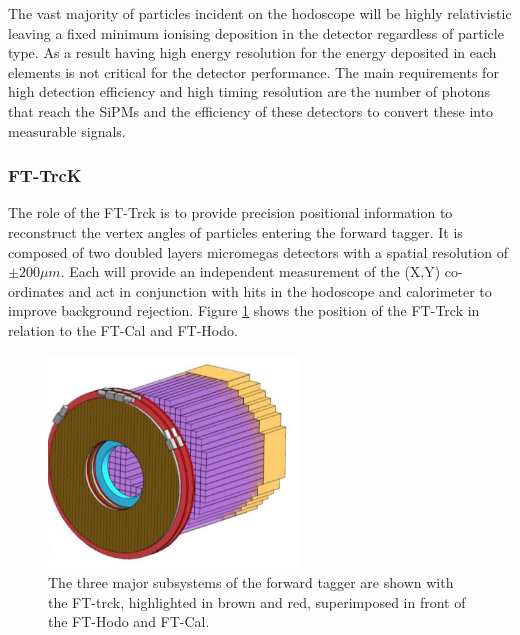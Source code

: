 The vast majority of particles incident on the hodoscope will be highly relativistic leaving a fixed minimum ionising deposition in the detector regardless of particle type. As a result having high energy resolution for the energy deposited in each elements is not critical for the detector performance. The main requirements for high detection efficiency and high timing resolution are the number of photons that reach the SiPMs and the efficiency of these detectors to convert these into measurable signals.

\subsubsection{FT-TrcK}

The role of the FT-Trck is to provide precision positional information to reconstruct the vertex angles of particles entering the forward tagger. It is composed of two doubled layers micromegas detectors with a spatial resolution of $\pm 200\mu{m}$. Each will provide an independent measurement of the (X,Y) co-ordinates and act in conjunction with hits in the hodoscope and calorimeter to improve background rejection. Figure \ref{fttrck} shows the position of the FT-Trck in relation to the FT-Cal and FT-Hodo.

\begin{figure}
	\centering
	\includegraphics[width=0.6\textwidth]{ImgChap1/fttrck}
	\caption{The three major subsystems of the forward tagger are shown with the FT-trck, highlighted in brown and red, superimposed in front of the FT-Hodo and FT-Cal. \cite{FTTDR2012} }
	\label{fttrck}
\end{figure}


